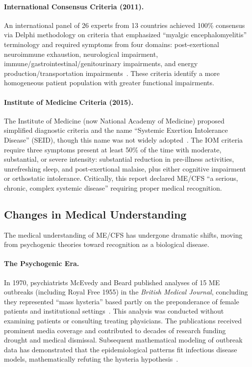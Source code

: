 \paragraph{International Consensus Criteria (2011).}
An international panel of 26 experts from 13 countries achieved 100\% consensus via Delphi methodology on criteria that emphasized ``myalgic encephalomyelitis'' terminology and required symptoms from four domains: post-exertional neuroimmune exhaustion, neurological impairment, immune/gastrointestinal/genitourinary impairments, and energy production/transportation impairments~\cite{Carruthers2011}. These criteria identify a more homogeneous patient population with greater functional impairments.

\paragraph{Institute of Medicine Criteria (2015).}
The Institute of Medicine (now National Academy of Medicine) proposed simplified diagnostic criteria and the name ``Systemic Exertion Intolerance Disease'' (SEID), though this name was not widely adopted~\cite{IOM2015}. The IOM criteria require three symptoms present at least 50\% of the time with moderate, substantial, or severe intensity: substantial reduction in pre-illness activities, unrefreshing sleep, and post-exertional malaise, plus either cognitive impairment or orthostatic intolerance. Critically, this report declared ME/CFS ``a serious, chronic, complex systemic disease'' requiring proper medical recognition.

\subsection{Changes in Medical Understanding}
\label{subsec:medical-understanding}

The medical understanding of ME/CFS has undergone dramatic shifts, moving from psychogenic theories toward recognition as a biological disease.

\paragraph{The Psychogenic Era.}
In 1970, psychiatrists McEvedy and Beard published analyses of 15 ME outbreaks (including Royal Free 1955) in the \emph{British Medical Journal}, concluding they represented ``mass hysteria'' based partly on the preponderance of female patients and institutional settings~\cite{McEvedy1970}. This analysis was conducted without examining patients or consulting treating physicians. The publications received prominent media coverage and contributed to decades of research funding drought and medical dismissal. Subsequent mathematical modeling of outbreak data has demonstrated that the epidemiological patterns fit infectious disease models, mathematically refuting the hysteria hypothesis~\cite{Underhill2021}.

